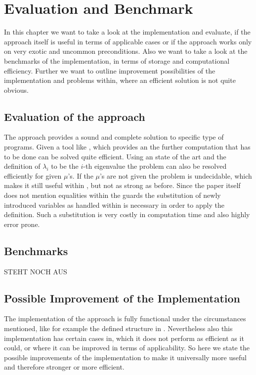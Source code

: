\chapter{Evaluation and Benchmark}
\label{chapter:eval}
In this chapter we want to take a look at the implementation and evaluate, if the approach itself is useful in terms of applicable cases or if the approach works only on very exotic and uncommon preconditions. \newline
Also we want to take a look at the benchmarks of the implementation, in terms of storage and computational efficiency. \newline
Further we want to outline improvement possibilities of the implementation and problems within, where an efficient solution is not quite obvious.

\section{Evaluation of the approach}
The approach provides a sound and complete solution to specific type of programs. Given a tool like \aprove, which provides an \its the further computation that has to be done can be solved quite efficient. Using an state of the art \solver and the definition of $\lambda_i$ to be the $i$-th eigenvalue the problem can also be resolved efficiently for given $\mu$'s. If the $\mu$'s are not given the problem is undecidable, which makes it still useful within \aprove, but not as strong as before. \newline
Since the paper itself does not mention equalities within the guards the substitution of newly introduced variables as handled within  is necessary in order to apply the definition. Such a substitution is very costly in computation time and also highly error prone.

\section{Benchmarks}


STEHT NOCH AUS


\section{Possible Improvement of the Implementation}
The implementation of the approach is fully functional under the circumstances mentioned, like for example the defined structure in . Nevertheless also this implementation has certain cases in, which it does not perform as efficient as it could, or where it can be improved in terms of applicability.
So here we state the possible improvements of the implementation to make it universally more useful and therefore stronger or more efficient.
